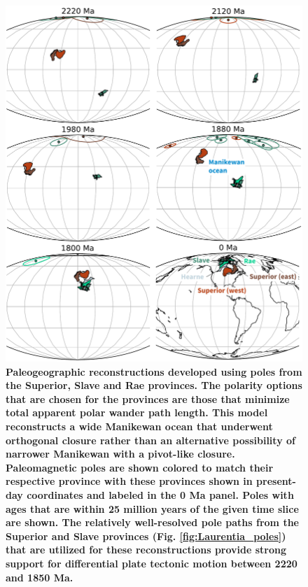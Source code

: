 \documentclass[11pt,letterpaper]{article}
\begin{document}
\begin{figure}
\centering
\includegraphics[width=\textwidth]{../Figures/Superior_Slave_reconstructions.pdf}
\caption{\small{\textbf{Paleogeographic reconstructions developed using poles from the Superior, Slave and Rae provinces. The polarity options that are chosen for the provinces are those that minimize total apparent polar wander path length. This model reconstructs a wide Manikewan ocean that underwent orthogonal closure rather than an alternative possibility of narrower Manikewan with a pivot-like closure. Paleomagnetic poles are shown colored to match their respective province with these provinces shown in present-day coordinates and labeled in the 0 Ma panel. Poles with ages that are within 25 million years of the given time slice are shown. The relatively well-resolved pole paths from the Superior and Slave provinces (Fig. \ref{fig:Laurentia_poles}) that are utilized for these reconstructions provide strong support for differential plate tectonic motion between 2220 and 1850 Ma.}}}
\label{fig:Superior_Slave_recons}
\end{figure} 
\end{document}
